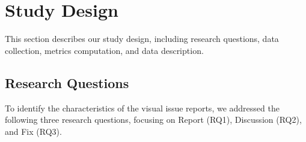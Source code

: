 \section{Study Design}
\label{sec:design}

This section describes our study design, including research questions, data collection, metrics computation, and data description.

\subsection{Research Questions}
\label{sec:rqs}

To identify the characteristics of the visual issue reports, we addressed the following three research questions, focusing on Report (RQ1), Discussion (RQ2), and Fix (RQ3). 
